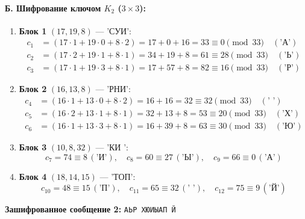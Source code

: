 \paragraph{Б. Шифрование ключом $K_2$ ($3\times3$):}
\begin{enumerate}
    \item \textbf{Блок 1} $(17, 19, 8)$ — 'СУИ':
    \[
    \begin{aligned}
        c_1 &= (17 \cdot 1 + 19 \cdot 0 + 8 \cdot 2) = 17 + 0 + 16 = 33 \equiv 0 \pmod{33} \quad (\text{'А'}) \\
        c_2 &= (17 \cdot 2 + 19 \cdot 1 + 8 \cdot 1) = 34 + 19 + 8 = 61 \equiv 28 \pmod{33} \quad (\text{'Ь'}) \\
        c_3 &= (17 \cdot 1 + 19 \cdot 3 + 8 \cdot 1) = 17 + 57 + 8 = 82 \equiv 16 \pmod{33} \quad (\text{'Р'})
    \end{aligned}
    \]
    \item \textbf{Блок 2} $(16, 13, 8)$ — 'РНИ':
    \[
    \begin{aligned}
        c_4 &= (16 \cdot 1 + 13 \cdot 0 + 8 \cdot 2) = 16 + 16 = 32 \equiv 32 \pmod{33} \quad (\text{' '}) \\
        c_5 &= (16 \cdot 2 + 13 \cdot 1 + 8 \cdot 1) = 32 + 13 + 8 = 53 \equiv 20 \pmod{33} \quad (\text{'Х'}) \\
        c_6 &= (16 \cdot 1 + 13 \cdot 3 + 8 \cdot 1) = 16 + 39 + 8 = 63 \equiv 30 \pmod{33} \quad (\text{'Ю'})
    \end{aligned}
    \]
    \item \textbf{Блок 3} $(10, 8, 32)$ — 'КИ ':
    \[
    c_7 = 74 \equiv 8 \, (\text{'И'}), \quad c_8 = 60 \equiv 27 \, (\text{'Ы'}), \quad c_9 = 66 \equiv 0 \, (\text{'А'})
    \]
    \item \textbf{Блок 4} $(18, 14, 15)$ — 'ТОП':
    \[
    c_{10} = 48 \equiv 15 \, (\text{'П'}), \quad c_{11} = 65 \equiv 32 \, (\text{' '}), \quad c_{12} = 75 \equiv 9 \, (\text{'Й'})
    \]
\end{enumerate}
\textbf{Зашифрованное сообщение 2:} \texttt{АЬР ХЮИЫАП Й}

